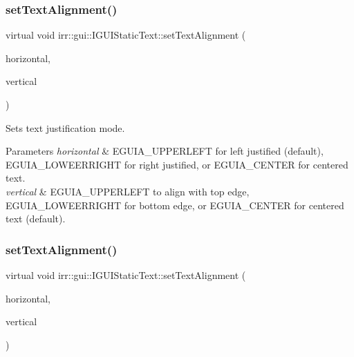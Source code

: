 \subsubsection{\texorpdfstring{set\+Text\+Alignment()}{setTextAlignment()}\hspace{0.1cm}{\footnotesize\ttfamily [1/2]}}
{\footnotesize\ttfamily virtual void irr\+::gui\+::\+I\+G\+U\+I\+Static\+Text\+::set\+Text\+Alignment (\begin{DoxyParamCaption}\item[{\hyperlink{namespaceirr_1_1gui_a19eb5fb40e67f108cb16aba922ddaa2d}{E\+G\+U\+I\+\_\+\+A\+L\+I\+G\+N\+M\+E\+NT}}]{horizontal,  }\item[{\hyperlink{namespaceirr_1_1gui_a19eb5fb40e67f108cb16aba922ddaa2d}{E\+G\+U\+I\+\_\+\+A\+L\+I\+G\+N\+M\+E\+NT}}]{vertical }\end{DoxyParamCaption})\hspace{0.3cm}{\ttfamily [pure virtual]}}



Sets text justification mode. 


\begin{DoxyParams}{Parameters}
{\em horizontal} & E\+G\+U\+I\+A\+\_\+\+U\+P\+P\+E\+R\+L\+E\+FT for left justified (default), E\+G\+U\+I\+A\+\_\+\+L\+O\+W\+E\+E\+R\+R\+I\+G\+HT for right justified, or E\+G\+U\+I\+A\+\_\+\+C\+E\+N\+T\+ER for centered text. \\
\hline
{\em vertical} & E\+G\+U\+I\+A\+\_\+\+U\+P\+P\+E\+R\+L\+E\+FT to align with top edge, E\+G\+U\+I\+A\+\_\+\+L\+O\+W\+E\+E\+R\+R\+I\+G\+HT for bottom edge, or E\+G\+U\+I\+A\+\_\+\+C\+E\+N\+T\+ER for centered text (default). \\
\hline
\end{DoxyParams}
\mbox{\label{classirr_1_1gui_1_1IGUIStaticText_ad8635f1247971277543cfff6e1fa9277}} 
\subsubsection{\texorpdfstring{set\+Text\+Alignment()}{setTextAlignment()}\hspace{0.1cm}{\footnotesize\ttfamily [2/2]}}
{\footnotesize\ttfamily virtual void irr\+::gui\+::\+I\+G\+U\+I\+Static\+Text\+::set\+Text\+Alignment (\begin{DoxyParamCaption}\item[{\hyperlink{namespaceirr_1_1gui_a19eb5fb40e67f108cb16aba922ddaa2d}{E\+G\+U\+I\+\_\+\+A\+L\+I\+G\+N\+M\+E\+NT}}]{horizontal,  }\item[{\hyperlink{namespaceirr_1_1gui_a19eb5fb40e67f108cb16aba922ddaa2d}{E\+G\+U\+I\+\_\+\+A\+L\+I\+G\+N\+M\+E\+NT}}]{vertical }\end{DoxyParamCaption})\hspace{0.3cm}{\ttfamily [pure virtual]}}



